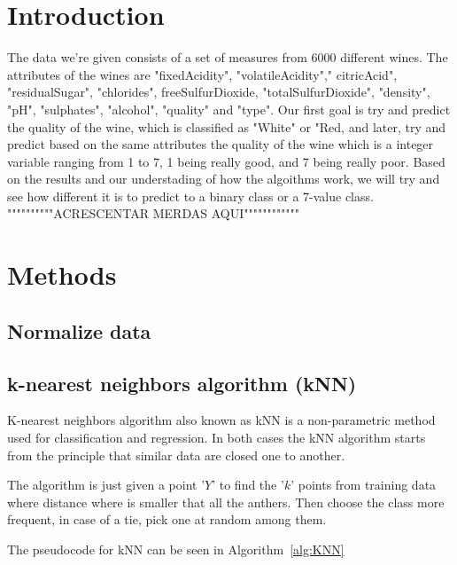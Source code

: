 \documentclass[twoside]{article}
\begin{document}
\begin{multicols}{2} %

\section{Introduction}
\indent \par
The data we're given consists of a set of measures from 6000 different wines. The attributes of the wines are "fixedAcidity", "volatileAcidity"," citricAcid", "residualSugar", "chlorides", freeSulfurDioxide, "totalSulfurDioxide", "density", "pH", "sulphates", "alcohol", "quality" and "type". Our first goal is try and predict the quality of the wine, which is classified as "White" or "Red, and later, try and predict based on the same attributes the quality of the wine which is a integer variable ranging from 1 to 7, 1 being really good, and 7 being really poor. Based on the results and our understading of how the algoithms work, we will try and see how different it is to predict to a binary class or a 7-value class.\\
 """"""""""ACRESCENTAR MERDAS AQUI""""""""""""



\section{Methods}
\subsection*{Normalize data}

\subsection*{k-nearest neighbors algorithm (kNN)}
\indent \par
K-nearest neighbors algorithm also known as kNN is a non-parametric method used for classification and regression. In both cases the kNN algorithm starts from the principle that similar data are closed one to another.\par
The algorithm is just given a point '$Y$' to find the '$k$' points from training data where distance where is smaller that all the anthers. Then choose the class more frequent, in case of a tie, pick one at random among them.\par
The pseudocode for kNN can be seen in Algorithm~\ref{alg:KNN} \cite{CA}


\end{multicols}
\end{document}
